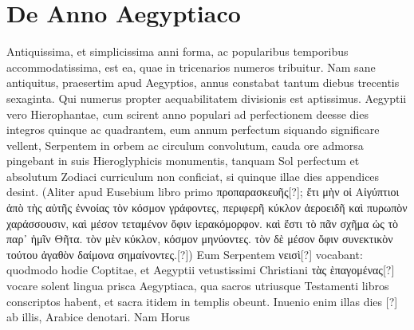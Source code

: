 \section{De Anno Aegyptiaco}
%
Antiquissima, et simplicissima anni forma, ac popularibus
temporibus accommodatissima, est ea, quae in tricenarios
numeros tribuitur.
Nam sane antiquitus, praesertim apud
Aegyptios, annus constabat tantum diebus trecentis sexaginta.
Qui numerus
propter aequabilitatem divisionis est aptissimus.
Aegyptii vero
Hierophantae, cum scirent anno populari ad perfectionem deesse dies
integros quinque ac quadrantem, eum annum perfectum siquando
significare vellent, Serpentem in orbem ac circulum convolutum,
cauda ore admorsa pingebant in suis Hieroglyphicis monumentis,
tanquam Sol perfectum et absolutum Zodiaci curriculum non conficiat,
si quinque illae dies appendices desint.
(Aliter apud Eusebium
libro primo \textgreek{προπαρασκευῆς}[?];
\textgreek{ἔτι μὴν οἱ Αἰγύπτιοι ἀπὸ τὴς αὐτῆς ἐννοίας
τὸν κόσμον γράφοντες, περιφερῆ κύκλον ἀεροειδῆ καὶ πυρωπὸν χαράσσουσιν, καὶ μέσον
τεταμένον ὄφιν ἱερακόμορφον. καὶ ἔστι τὸ πᾶν σχῆμα ὡς τὸ παρ᾽ ἡμῖν Θῆτα.
τὸν μὲν κύκλον, κόσμον μηνύοντες. τὸν δὲ μέσον ὄφιν συνεκτικὸν τούτου ἀγαθὸν
δαίμονα σημαίνοντες.}[?])
Eum Serpentem \textgreek{νεισὶ}[?] vocabant: quodmodo hodie
Coptitae, et Aegyptii vetustissimi Christiani
 \textgreek{τὰς ὲπαγομένας}[?] vocare
solent lingua prisca Aegyptiaca, qua sacros utriusque Testamenti
libros conscriptos habent, et sacra itidem in templis obeunt.
Inuenio enim illas dies \textarabic{}[?] ab illis, Arabice denotari.
Nam Horus
